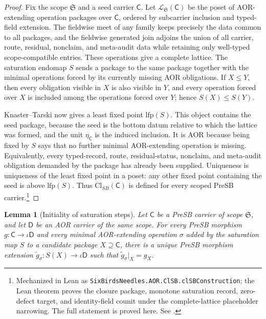 \documentclass[11pt]{article}
\newcommand{\ClSB}{\mathrm{Cl}_{SB}}
\newtheorem{lemma}[theorem]{Lemma}
\theoremstyle{definition}
\begin{document}
\begin{proof}
Fix the scope \(\mathfrak S\) and a seed carrier \(\mathsf C\).  Let
\(\mathcal L_{\mathfrak S}(\mathsf C)\) be the poset of AOR-extending
operation packages over \(\mathsf C\), ordered by subcarrier inclusion and
typed-field extension.  The fieldwise meet of any family keeps precisely the
data common to all packages, and the fieldwise generated join adjoins the
union of all carrier, route, residual, nonclaim, and meta-audit data while
retaining only well-typed scope-compatible entries.  These operations give a
complete lattice.  The saturation endomap \(S\) sends a package to the same
package together with the minimal operations forced by its currently missing
AOR obligations.  If \(X\le Y\), then every obligation visible in \(X\) is
also visible in \(Y\), and every operation forced over \(X\) is included
among the operations forced over \(Y\); hence \(S(X)\le S(Y)\).

Knaster--Tarski \citep{TarskiFixedPoint1955} now gives a least fixed
point \(\mathrm{lfp}(S)\).  This object contains the seed package,
because the seed is the bottom datum relative to which the lattice was
formed, and the unit \(\eta_{\mathsf C}\) is the induced inclusion.  It is AOR because
being fixed by \(S\) says that no further minimal AOR-extending operation is
missing.  Equivalently, every typed-record, route, residual-status,
nonclaim, and meta-audit obligation demanded by the package has already
been supplied.  Uniqueness is uniqueness of the least fixed point in a
poset: any other fixed point containing the seed is above \(\mathrm{lfp}(S)\).
Thus \(\ClSB(\mathsf C)\) is defined for every scoped PreSB carrier.\footnote{Mechanized in Lean as \texttt{SixBirdsNeedles.AOR.ClSB.clSBConstruction}; the Lean theorem proves the closure package, monotone saturation record, zero-defect target, and identity-field counit under the complete-lattice placeholder narrowing. The full statement is proved here. See .}
\end{proof}

\begin{lemma}[Initiality of saturation steps]
Let \(\mathsf C\) be a PreSB carrier of scope \(\mathfrak S\), and let
\(\mathsf D\) be an AOR carrier of the same scope.  For every PreSB
morphism \(g:\mathsf C\to\iota\mathsf D\) and every minimal
AOR-extending operation \(\sigma\) added by the saturation map \(S\) to
a candidate package \(X\supseteq\mathsf C\), there is a unique PreSB
morphism extension
\(\widetilde g_\sigma:S(X)\to\iota\mathsf D\) such that
\(\widetilde g_\sigma|_X=g_X\).
\end{lemma}
\end{document}
